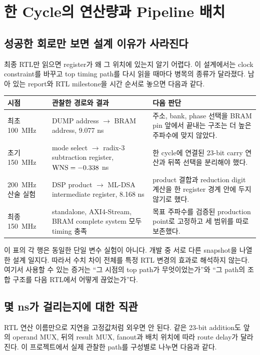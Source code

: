 \chapter{한 Cycle의 연산량과 Pipeline 배치}

\section{성공한 회로만 보면 설계 이유가 사라진다}

최종 RTL만 읽으면 register가 왜 그 위치에 있는지 알기 어렵다. 이 설계에서는
clock constraint를 바꾸고 top timing path를 다시 읽을 때마다 병목의 종류가
달라졌다. 남아 있는 report와 RTL milestone을 시간 순서로 놓으면 다음과 같다.

\begin{longtable}{L{22mm}L{50mm}L{68mm}}
\toprule
시점 & 관찰한 경로와 결과 & 다음 판단 \\
\midrule
최초 100~MHz &
DUMP address $\rightarrow$ BRAM address,
9.077 ns &
주소, bank, phase 선택을 BRAM pin 앞에서 끝내는 구조는 더 높은 주파수에
맞지 않았다. \\
초기 150~MHz &
mode select $\rightarrow$ radix-3 subtraction register,
$\mathrm{WNS}=-0.338$ ns &
한 cycle에 연결된 23-bit carry 연산과 뒤쪽 선택을 분리해야 했다. \\
200~MHz 산술 실험 &
DSP product $\rightarrow$ ML-DSA intermediate register,
8.168 ns &
product 결합과 reduction digit 계산을 한 register 경계 안에 두지 않기로 했다. \\
최종 150~MHz &
standalone, AXI4-Stream, BRAM complete system 모두 timing 충족 &
목표 주파수를 검증된 production point로 고정하고 세 범위를 따로 보존했다. \\
\bottomrule
\end{longtable}

이 표의 각 행은 동일한 단일 변수 실험이 아니다. 개발 중 서로 다른 snapshot을
나열한 설계 일지다. 따라서 수치 차이 전체를 특정 RTL 변경의 효과로 해석하지
않는다. 여기서 사용할 수 있는 증거는 “그 시점의 top path가 무엇이었는가”와
“그 path의 조합 구조를 다음 RTL에서 어떻게 끊었는가”다.

\section{몇 ns가 걸리는지에 대한 직관}

RTL 연산 이름만으로 지연을 고정값처럼 외우면 안 된다. 같은 23-bit addition도
앞의 operand MUX, 뒤의 result MUX, fanout과 배치 위치에 따라 route delay가
달라진다. 이 프로젝트에서 실제 관찰한 path를 구성별로 나누면 다음과 같다.

